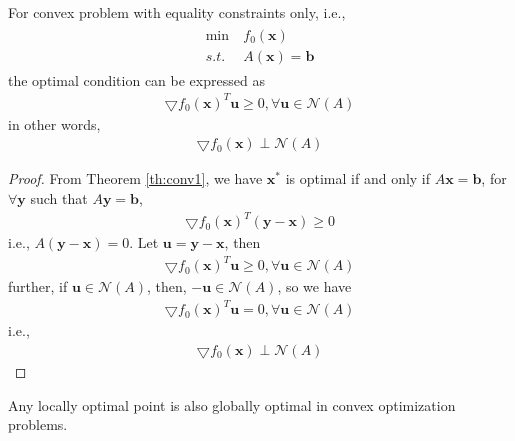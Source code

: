 \begin{lemma}
For convex problem with equality constraints only,
i.e.,
\begin{align}
    \begin{array}{ll}
        \min \ &f_0 (\mathbf{x}) \\
        s.t. \ &A (\mathbf{x}) = \mathbf{b} 
    \end{array}
\end{align}
the optimal condition can be expressed as
\begin{align}
    \bigtriangledown f_0(\mathbf{x})^T \mathbf{u}
    \geq 0, \forall \mathbf{u} \in \mathcal{N}(A)
\end{align}
in other words,
\begin{align}
    \bigtriangledown f_0(\mathbf{x}) \perp
    \mathcal{N}(A)
\end{align}
\end{lemma}

\begin{proof}
    From Theorem \ref{th:conv1}, we have
    $\mathbf{x}^*$ is optimal if and only if
    $A\mathbf{x} = \mathbf{b}$, for $\forall \mathbf{y}$
    such that $A\mathbf{y} = \mathbf{b}$,
    \begin{align}
        \bigtriangledown f_0(\mathbf{x})^T (\mathbf{y}
    - \mathbf{x}) \geq 0
    \end{align}
    i.e., $A(\mathbf{y} - \mathbf{x}) = 0$.
    Let $\mathbf{u} = \mathbf{y} - \mathbf{x}$,
    then
    \begin{align}
        \bigtriangledown f_0(\mathbf{x})^T \mathbf{u}
        \geq 0, \forall \mathbf{u} \in \mathcal{N}(A)
    \end{align}
    further, if $\mathbf{u} \in \mathcal{N}(A)$,
    then, $-\mathbf{u} \in \mathcal{N}(A)$, so we have
    \begin{align}
        \bigtriangledown f_0(\mathbf{x})^T \mathbf{u}
        = 0, \forall \mathbf{u} \in \mathcal{N}(A)
    \end{align}
    i.e.,
    \begin{align}
        \bigtriangledown f_0(\mathbf{x}) \perp
        \mathcal{N}(A)
    \end{align}
\end{proof}

\begin{lemma}
    Any locally optimal point is also globally optimal
    in convex optimization problems.
\end{lemma}

